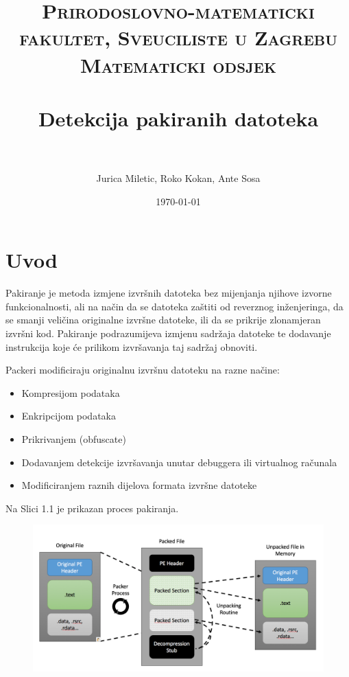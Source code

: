 \documentclass[paper=a4, fontsize=11pt]{scrartcl} %
\title{	
\normalfont \normalsize 
\textsc{Prirodoslovno-matematicki fakultet, Sveuciliste u Zagrebu \\ Matematicki odsjek} \\ [25pt] %
\horrule{0.5pt} \\[0.4cm] %
\huge Detekcija pakiranih datoteka \\ %
\horrule{2pt} \\[0.5cm] %
}
\author{Jurica Miletic, Roko Kokan, Ante Sosa} %
\date{\normalsize\today} %
\numberwithin{equation}{section} %
\numberwithin{figure}{section} %
\numberwithin{table}{section} %
\begin{document}
\maketitle %


\section{Uvod}

Pakiranje je metoda izmjene izvršnih datoteka bez mijenjanja njihove izvorne funkcionalnosti,
ali na način da se datoteka zaštiti od reverznog inženjeringa, da se smanji veličina originalne
izvršne datoteke, ili da se prikrije zlonamjeran izvršni kod. Pakiranje podrazumijeva izmjenu
sadržaja datoteke te dodavanje instrukcija koje će prilikom izvršavanja taj sadržaj obnoviti.

\vspace{2.5mm}
Packeri modificiraju originalnu izvršnu datoteku na razne načine:
\begin{itemize}
\item Kompresijom podataka
\item Enkripcijom podataka
\item  Prikrivanjem (obfuscate)
\item  Dodavanjem detekcije izvršavanja unutar debuggera ili virtualnog računala 
\item Modificiranjem raznih dijelova formata izvršne datoteke
\end{itemize}

Na Slici 1.1 je prikazan proces pakiranja. \\
\begin{figure}[ht]
\includegraphics[width=15cm]{Packers.png}
\caption{}
\centering
\end{figure}
\end{document}
